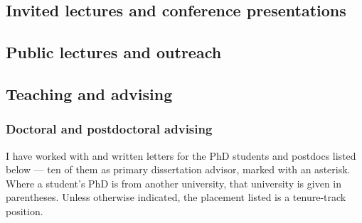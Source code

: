 \documentclass[11pt]{article}
\newcommand{\rubric}[1]{\subsubsection*{#1}}
\begin{document}
\subsection*{Invited lectures and conference presentations}

\begin{itemize}

\end{itemize}

\subsection*{Public lectures and outreach}

\begin{itemize}

\end{itemize}


\subsection*{Teaching and advising}

\rubric{Doctoral and postdoctoral advising}

I have worked with and written letters for the PhD students and postdocs
listed below --- ten of them as primary dissertation advisor, marked with an
asterisk. Where a student's PhD is from another university, that university is
given in parentheses. Unless otherwise indicated, the placement listed is a
tenure-track position.
\end{document}
